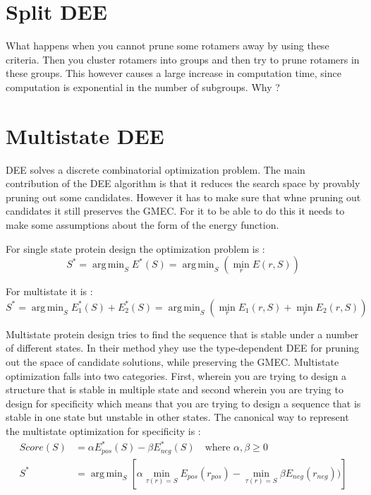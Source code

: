 \documentclass[a4]{article}
\DeclareMathOperator*{\argmin}{arg\,min}
\begin{document}
\section{Split DEE}
What happens when you cannot prune some rotamers away by using these criteria. Then you cluster rotamers into groups and then try to prune rotamers in these groups. This however causes a large increase in computation time, since computation is exponential in the number of subgroups. Why ?

\section{Multistate DEE}
DEE solves a discrete combinatorial optimization problem. The main contribution of the DEE algorithm is that it reduces the search space by provably pruning out some candidates. However it has to make sure that whne pruning out candidates it still preserves the GMEC. For it to be able to do this it needs to make some assumptions about the form of the energy function. 

For single state protein design the optimization problem is  : 
\[
S^* = \argmin_S E^*(S) = \argmin_S \left( \min_r E(r,S) \right)
\]

For multistate it is :
\[
S^* = \argmin_S E^*_1(S) + E^*_2(S) = \argmin_S\left( \min_r E_1(r,S) + \min_r E_2(r,S)\right)
\]

Multistate protein design tries to find the sequence that is stable under a number of different states. In their method yhey use the type-dependent DEE for pruning out the space of candidate solutions, while preserving the GMEC. Multistate optimization falls into two categories. First, wherein you are trying to design a structure that is stable in multiple state and second wherein you are trying to design for specificity which means that you are trying to design a sequence that is stable in one state but unstable in other states. The canonical way to represent the multistate optimization for specificity is :
\[
\begin{split}
Score(S) &= \alpha E_{pos}^*(S) - \beta E_{neg}^*(S) \quad \text{where } \alpha,\beta \geq 0 \\
S^* & = \argmin_S \left[\alpha \min_{\tau(r)=S} E_{pos}(r_{pos}) - \min_{\tau(r)=S} \beta E_{neg}(r_{neg})) \right]
\end{split} 
\]
\end{document}
